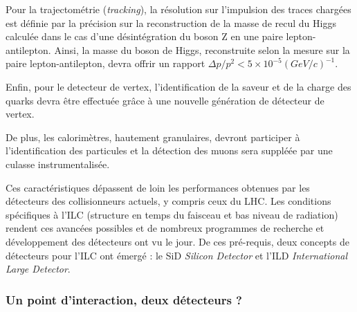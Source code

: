   \medskip
  
  Pour la trajectom\'etrie (\textit{tracking}), la résolution sur l'impulsion des traces charg\'ees est d\'efinie par la pr\'ecision sur la reconstruction de la masse de recul du Higgs calcul\'ee dans le cas d'une d\'esint\'egration du boson Z en une paire lepton-antilepton. Ainsi, la masse du boson de Higgs, reconstruite selon la mesure sur la paire lepton-antilepton, devra offrir un rapport $\Delta p / p^2 < 5\times 10^{-5} (GeV/c)^{-1}$. 
  
  \medskip
  
  Enfin, pour le detecteur de vertex, l'identification de la saveur et de la charge des quarks devra \^etre effectu\'ee gr\^ace \`a une nouvelle g\'en\'eration de d\'etecteur de vertex.
  
  \medskip
  
  De plus, les calorim\`etres, hautement granulaires, devront participer \`a l'identification des particules et la d\'etection des muons sera suppl\'e\'ee par une culasse instrumentalis\'ee.
  
  \medskip
  
  Ces caract\'eristiques d\'epassent de loin les performances obtenues par les détecteurs des collisionneurs actuels, y compris ceux du LHC. Les conditions sp\'ecifiques \`a l'ILC (structure en temps du faisceau et bas niveau de radiation) rendent ces avanc\'ees possibles et de nombreux programmes de recherche et d\'eveloppement des d\'etecteurs ont vu le jour. De ces pr\'e-requis, deux concepts de d\'etecteurs pour l'ILC ont \'emerg\'e : le SiD \textit{Silicon Detector} et l'ILD \textit{International Large Detector}.
  
  \subsubsection{Un point d'interaction, deux d\'etecteurs ?}
  

